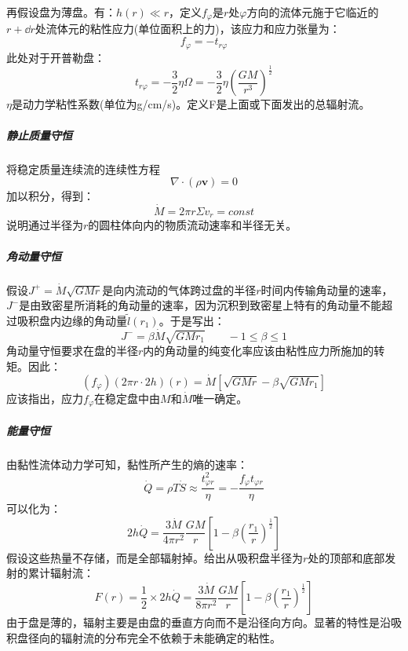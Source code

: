 再假设盘为薄盘。有：$h(r)\ll r$，定义$f_{\varphi}$是$r$处$\varphi$方向的流体元施于它临近的$r+\dd r$处流体元的粘性应力(单位面积上的力)，该应力和应力张量为：
\begin{equation}
	f_{\varphi}=-t_{r\varphi}
\end{equation}
此处对于开普勒盘：
\begin{equation}
	t_{r\varphi}=-\frac{3}{2}\eta\Omega=-\frac{3}{2}\eta\left(\frac{GM}{r^3}\right)^{\frac{1}{2}}
\end{equation}
$\eta$是动力学粘性系数(单位为g/cm/s)。定义F是上面或下面发出的总辐射流。
\subparagraph{静止质量守恒}将稳定质量连续流的连续性方程
\begin{equation}
	\nabla\cdot(\rho\boldsymbol{v})=0
\end{equation}
加以积分，得到：
\begin{equation}
	\dot{M}=2\pi r\varSigma v_{r}=const
\end{equation}
说明通过半径为$r$的圆柱体向内的物质流动速率和半径无关。
\subparagraph{角动量守恒}假设$J^{+}=\dot{M}\sqrt{GMr}$是向内流动的气体跨过盘的半径$r$时间内传输角动量的速率，$J^{-}$是由致密星所消耗的角动量的速率，因为沉积到致密星上特有的角动量不能超过吸积盘内边缘的角动量$\tilde{l}(r_{1})$。于是写出：
\begin{equation}
	J^{-}=\beta\dot{M}\sqrt{GMr_{1}}\qquad -1\leq\beta\leq 1
\end{equation}
角动量守恒要求在盘的半径$r$内的角动量的纯变化率应该由粘性应力所施加的转矩。因此：
\begin{equation}
	(f_{\varphi})(2\pi r\cdot 2h)(r)=\dot{M}\left[\sqrt{GMr}-\beta\sqrt{GMr_{1}}\right]
\end{equation}
应该指出，应力$f_{\varphi}$在稳定盘中由$M$和$\dot{M}$唯一确定。
\subparagraph{能量守恒}由黏性流体动力学可知，黏性所产生的熵的速率：
\begin{equation}
	\dot{Q}=\rho T\dot{S}\approx\frac{t_{\varphi r}^2}{\eta}=-\frac{f_{\varphi}t_{\varphi r}}{\eta}
\end{equation}
可以化为：
\begin{equation}
	2h\dot{Q}=\frac{3\dot{M}}{4\pi r^2}\frac{GM}{r}\left[1-\beta\left(\frac{r_{1}}{r}\right)^{\frac{1}{2}}\right]
\end{equation}
假设这些热量不存储，而是全部辐射掉。给出从吸积盘半径为$r$处的顶部和底部发射的累计辐射流：
\begin{equation}
	F(r)=\frac{1}{2}\times 2h\dot{Q}=\frac{3\dot{M}}{8\pi r^2}\frac{GM}{r}\left[1-\beta\left(\frac{r_{1}}{r}\right)^{\frac{1}{2}}\right]
\end{equation}
由于盘是薄的，辐射主要是由盘的垂直方向而不是沿径向方向。显著的特性是沿吸积盘径向的辐射流的分布完全不依赖于未能确定的粘性。

